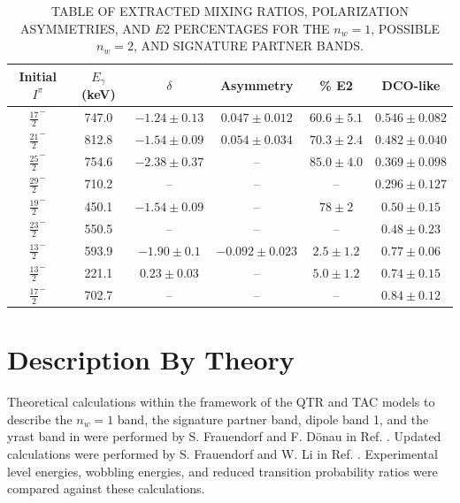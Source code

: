 \begin{table}
\begin{center}
\caption{TABLE OF EXTRACTED MIXING RATIOS, POLARIZATION ASYMMETRIES, AND $E2$ PERCENTAGES FOR THE $n_w=1$, POSSIBLE $n_w=2$, AND SIGNATURE PARTNER BANDS.\label{tbl:chp4-mixing-asym}}
\begin{tabular}{|c|c|c|c|c|c|}
\hline
\hline
Initial $I^\pi{}$ &$E_{\gamma}$ (keV) &$\delta$ & Asymmetry & \% E2 & DCO-like\\
\hline
$\frac{17}{2}^-$ & 747.0 & $-1.24\pm0.13$ & $0.047\pm0.012$ & $60.6\pm5.1$ & $0.546\pm0.082$\\
$\frac{21}{2}^-$ & 812.8 & $-1.54\pm0.09$ & $0.054\pm0.034$ & $70.3\pm2.4$ & $0.482\pm0.040$\\
$\frac{25}{2}^-$ & 754.6 & $-2.38\pm0.37$ & -- & $85.0\pm4.0$ & $0.369\pm0.098$\\
$\frac{29}{2}^-$ & 710.2 & -- & -- & -- & $0.296\pm0.127$\\
\hline
$\frac{19}{2}^-$ & 450.1 & $-1.54\pm0.09$ & -- & $78\pm2$ & $0.50\pm0.15$\\
$\frac{23}{2}^-$ & 550.5 & -- & -- & -- & $0.48\pm0.23$\\
\hline
$\frac{13}{2}^-$ & 593.9 & $-1.90\pm0.1$ & $-0.092\pm{}0.023$ & $2.5\pm1.2$ & $0.77\pm0.06$\\
$\frac{13}{2}^-$ & 221.1 & $0.23\pm0.03$ & -- & $5.0\pm1.2$ & $0.74\pm0.15$\\
$\frac{17}{2}^-$ & 702.7 & -- & -- & -- & $0.84\pm0.12$\\
\hline
\hline\end{tabular}
\end{center}
\end{table}

\section{Description By Theory}
\label{sec:trw-theory-desc}
Theoretical calculations within the framework of the QTR and TAC models to describe the $n_w=1$ band, the signature partner band, dipole band 1, and the yrast band in \pr{} were performed by S. Frauendorf and F. D\"onau in Ref. \cite{frauendorfTransverseWobbling}. Updated calculations were performed by S. Frauendorf and W. Li in Ref. \cite{mattaTransversePRL}. Experimental level energies, wobbling energies, and reduced transition probability ratios were compared against these calculations.

